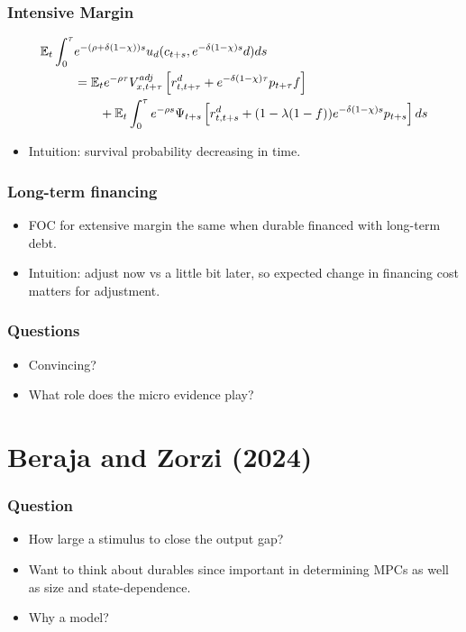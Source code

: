 \documentclass[english,xcolor=svgnames]{beamer}
\begin{document}
\begin{frame}
    \frametitle{Intensive Margin}
\begin{align*}
		\mathbb{E}_t\int_0^{\tau} &e^{-(\rho+\delta(1-\chi)) s} u_d(c_{t+s},e^{-\delta(1-\chi) s}d)ds \\
		&=   \mathbb{E}_t e^{-\rho \tau}V_{x,t+\tau}^{adj}\left[r^d_{t,t+\tau}  + e^{-\delta(1-\chi) \tau}p_{t+\tau} f\right] \\
		& \qquad + \mathbb{E}_t\int_0^{\tau}e^{-\rho s}\Psi_{t+s}\left[r^d_{t,t+s} + (1-\lambda(1-f))e^{-\delta(1-\chi)s}p_{t+s}\right]ds \\
	\end{align*}
\begin{itemize}
	\item Intuition: survival probability decreasing in time.
\end{itemize}
\end{frame}

\begin{frame}
    \frametitle{Long-term financing}
\begin{itemize}
	\item FOC for extensive margin the same when durable financed with long-term debt.
	\item Intuition: adjust now vs a little bit later, so expected change in financing cost matters for adjustment.
\end{itemize}
\end{frame}

\begin{frame}
    \frametitle{Questions}
	\begin{itemize}
		\item Convincing?
		\item What role does the micro evidence play?
	\end{itemize}
\end{frame}

\section{Beraja and Zorzi (2024)}

\begin{frame}
    \frametitle{Question}
	\begin{itemize}
		\item How large a stimulus to close the output gap?
		\item Want to think about durables since important in determining MPCs as well as size and state-dependence.
		\item Why a model?
	\end{itemize}
\end{frame}
\end{document}
